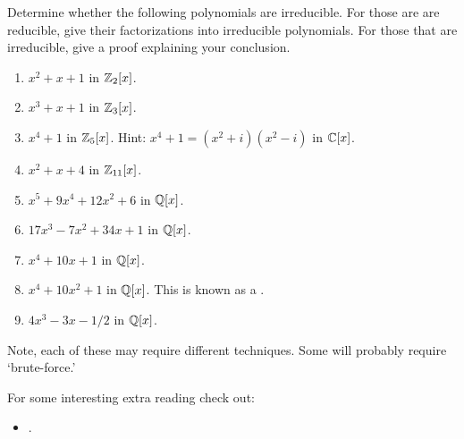 \documentclass{ximera}
\begin{document}
\begin{exercise}
  Determine whether the following polynomials are irreducible. For those
  are are reducible, give their factorizations into irreducible
  polynomials. For those that are irreducible, give a proof explaining
  your conclusion.
  \begin{enumerate}
  \item $x^2 + x +1$ in $\mathbb Z_2[x]$.
  \item $x^3 + x + 1$ in $\mathbb Z_3[x]$.
  \item $x^4+1$ in $\mathbb Z_5[x]$. Hint: $x^4+1 = (x^2+i)(x^2-i)$ in
    $\mathbb C[x]$.
  \item $x^2 + x + 4$ in $\mathbb Z_{11}[x]$.
  \item $x^5 + 9x^4 + 12x^2 + 6$ in  $\mathbb Q[x]$.
  \item $17 x^3 - 7x^2 + 34x + 1$ in $\mathbb Q[x]$.
  \item $x^4 + 10x + 1$ in $\mathbb Q[x]$.
  \item $x^4 + 10x^2 + 1$ in $\mathbb Q[x]$. This is known as a
    .
  \item $4x^3 -3x -1/2$ in $\mathbb Q[x]$.
  \end{enumerate}
  \begin{hint}
    Note, each of these may require different techniques. Some will
    probably require `brute-force.'
  \end{hint}
\end{exercise}





For some interesting extra reading check out:
\begin{itemize}
\item {}.

\end{itemize}
\end{document}
